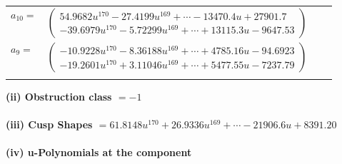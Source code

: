 \documentclass[1p]{elsarticle_modified}
\theoremstyle{definition}
\begin{document}
\begin{tabular}{m{7pt} m{180pt} m{7pt} m{180pt} }
\flushright $a_{10}=$&$\begin{pmatrix}54.9682 u^{170}-27.4199 u^{169}+\cdots-13470.4 u+27901.7\\-39.6979 u^{170}-5.72299 u^{169}+\cdots+13115.3 u-9647.53\end{pmatrix}$ \\
\flushright $a_{9}=$&$\begin{pmatrix}-10.9228 u^{170}-8.36188 u^{169}+\cdots+4785.16 u-94.6923\\-19.2601 u^{170}+3.11046 u^{169}+\cdots+5477.55 u-7237.79\end{pmatrix}$\\&\end{tabular}
\flushleft \textbf{(ii) Obstruction class $= -1$}\\~\\
\flushleft \textbf{(iii) Cusp Shapes $= 61.8148 u^{170}+26.9336 u^{169}+\cdots-21906.6 u+8391.20$}\\~\\
\newpage\renewcommand{\arraystretch}{1}
\flushleft \textbf{(iv) u-Polynomials at the component}\newline \\
\end{document}
